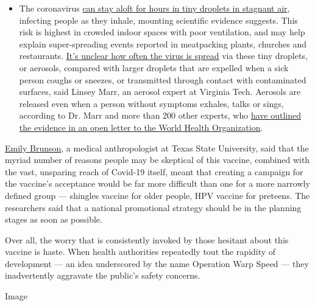 \begin{itemize}
  \begin{itemize}
  \tightlist
  \item
    The coronavirus
    \href{https://www.nytimes.com/2020/07/04/health/239-experts-with-one-big-claim-the-coronavirus-is-airborne.html?action=click\&pgtype=Article\&state=default\&region=MAIN_CONTENT_3\&context=storylines_faq}{can
    stay aloft for hours in tiny droplets in stagnant air}, infecting
    people as they inhale, mounting scientific evidence suggests. This
    risk is highest in crowded indoor spaces with poor ventilation, and
    may help explain super-spreading events reported in meatpacking
    plants, churches and restaurants.
    \href{https://www.nytimes.com/2020/07/06/health/coronavirus-airborne-aerosols.html?action=click\&pgtype=Article\&state=default\&region=MAIN_CONTENT_3\&context=storylines_faq}{It's
    unclear how often the virus is spread} via these tiny droplets, or
    aerosols, compared with larger droplets that are expelled when a
    sick person coughs or sneezes, or transmitted through contact with
    contaminated surfaces, said Linsey Marr, an aerosol expert at
    Virginia Tech. Aerosols are released even when a person without
    symptoms exhales, talks or sings, according to Dr. Marr and more
    than 200 other experts, who
    \href{https://academic.oup.com/cid/article/doi/10.1093/cid/ciaa939/5867798}{have
    outlined the evidence in an open letter to the World Health
    Organization}.
  \end{itemize}
\end{itemize}

\href{https://www.txstate.edu/anthropology/people/faculty/brunson.html}{Emily
Brunson}, a medical anthropologist at Texas State University, said that
the myriad number of reasons people may be skeptical of this vaccine,
combined with the vast, unsparing reach of Covid-19 itself, meant that
creating a campaign for the vaccine's acceptance would be far more
difficult than one for a more narrowly defined group --- shingles
vaccine for older people, HPV vaccine for preteens. The researchers said
that a national promotional strategy should be in the planning stages as
soon as possible.

Over all, the worry that is consistently invoked by those hesitant about
this vaccine is haste. When health authorities repeatedly tout the
rapidity of development --- an idea underscored by the name Operation
Warp Speed --- they inadvertently aggravate the public's safety
concerns.

Image

